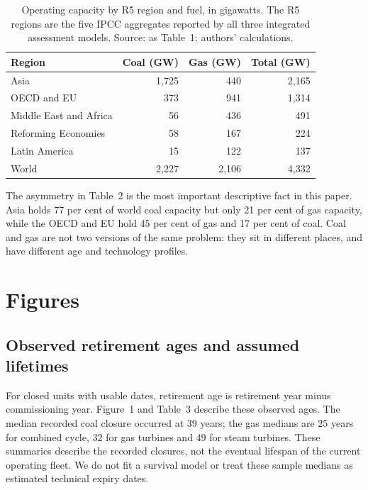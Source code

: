 \documentclass[11pt,a4paper]{article}
\begin{document}
\begin{table}[htbp]
\centering
\caption{Operating capacity by R5 region and fuel, in gigawatts. The R5 regions are the five IPCC aggregates reported by all three integrated assessment models. Source: as Table~1; authors' calculations.}
\label{tab:regions}
\small
\begin{tabular}{lrrr}
\toprule
Region & Coal (GW) & Gas (GW) & Total (GW) \\
\midrule
Asia                    & 1{,}725 &   440 & 2{,}165 \\
OECD and EU             &   373 &   941 & 1{,}314 \\
Middle East and Africa  &    56 &   436 &   491 \\
Reforming Economies     &    58 &   167 &   224 \\
Latin America           &    15 &   122 &   137 \\
\midrule
World                   & 2{,}227 & 2{,}106 & 4{,}332 \\
\bottomrule
\end{tabular}
\end{table}

The asymmetry in Table~2 is the most important descriptive fact in this paper. Asia holds 77 per cent of world coal capacity but only 21 per cent of gas capacity, while the OECD and EU hold 45 per cent of gas and 17 per cent of coal. Coal and gas are not two versions of the same problem: they sit in different places, and have different age and technology profiles.

\section{Figures}

\subsection*{Observed retirement ages and assumed lifetimes}

For closed units with usable dates, retirement age is retirement year minus commissioning year. Figure~1 and Table~3 describe these observed ages. The median recorded coal closure occurred at 39 years; the gas medians are 25 years for combined cycle, 32 for gas turbines and 49 for steam turbines. These summaries describe the recorded closures, not the eventual lifespan of the current operating fleet. We do not fit a survival model or treat these sample medians as estimated technical expiry dates.
\end{document}
